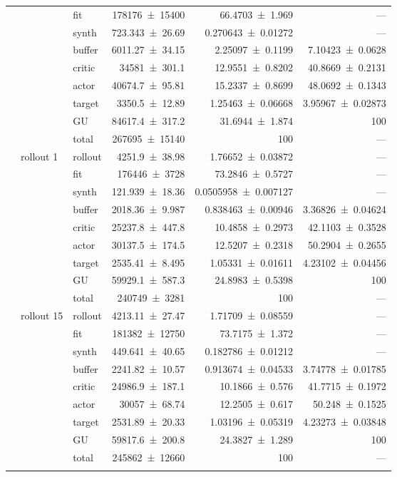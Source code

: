 {\begin{longtable}{@{}lllrrr@{}}
     &  & fit & \num{178176+-15400} & \num{66.4703+-1.969} & --- \\
     &  & synth & \num{723.343+-26.69} & \num{0.270643+-0.01272} & --- \\
     &  & buffer & \num{6011.27+-34.15} & \num{2.25097+-0.1199} & \num{7.10423+-0.0628} \\
     &  & critic & \num{34581+-301.1} & \num{12.9551+-0.8202} & \num{40.8669+-0.2131} \\
     &  & actor & \num{40674.7+-95.81} & \num{15.2337+-0.8699} & \num{48.0692+-0.1343} \\
     &  & target & \num{3350.5+-12.89} & \num{1.25463+-0.06668} & \num{3.95967+-0.02873} \\
     &  & GU & \num{84617.4+-317.2} & \num{31.6944+-1.874} & 100 \\
     &  & total & \num{267695+-15140} & \num{100} & --- \\
    \addlinespace[2pt]
     & rollout 1 & rollout & \num{4251.9+-38.98} & \num{1.76652+-0.03872} & --- \\
     &  & fit & \num{176446+-3728} & \num{73.2846+-0.5727} & --- \\
     &  & synth & \num{121.939+-18.36} & \num{0.0505958+-0.007127} & --- \\
     &  & buffer & \num{2018.36+-9.987} & \num{0.838463+-0.00946} & \num{3.36826+-0.04624} \\
     &  & critic & \num{25237.8+-447.8} & \num{10.4858+-0.2973} & \num{42.1103+-0.3528} \\
     &  & actor & \num{30137.5+-174.5} & \num{12.5207+-0.2318} & \num{50.2904+-0.2655} \\
     &  & target & \num{2535.41+-8.495} & \num{1.05331+-0.01611} & \num{4.23102+-0.04456} \\
     &  & GU & \num{59929.1+-587.3} & \num{24.8983+-0.5398} & 100 \\
     &  & total & \num{240749+-3281} & \num{100} & --- \\
    \addlinespace[2pt]
     & rollout 15 & rollout & \num{4213.11+-27.47} & \num{1.71709+-0.08559} & --- \\
     &  & fit & \num{181382+-12750} & \num{73.7175+-1.372} & --- \\
     &  & synth & \num{449.641+-40.65} & \num{0.182786+-0.01212} & --- \\
     &  & buffer & \num{2241.82+-10.57} & \num{0.913674+-0.04533} & \num{3.74778+-0.01785} \\
     &  & critic & \num{24986.9+-187.1} & \num{10.1866+-0.576} & \num{41.7715+-0.1972} \\
     &  & actor & \num{30057+-68.74} & \num{12.2505+-0.617} & \num{50.248+-0.1525} \\
     &  & target & \num{2531.89+-20.33} & \num{1.03196+-0.05319} & \num{4.23273+-0.03848} \\
     &  & GU & \num{59817.6+-200.8} & \num{24.3827+-1.289} & 100 \\
     &  & total & \num{245862+-12660} & \num{100} & --- \\
    \addlinespace[2pt]
  \end{longtable}
}

